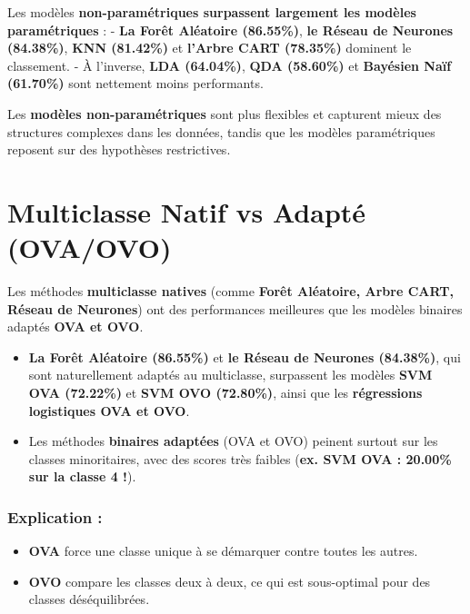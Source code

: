 \documentclass[
]{article}
\providecommand{\tightlist}{%
  \setlength{\itemsep}{0pt}\setlength{\parskip}{0pt}}\usepackage{longtable,booktabs,array}
\begin{document}
Les modèles \textbf{non-paramétriques surpassent largement les modèles
paramétriques} : - \textbf{La Forêt Aléatoire (86.55\%)}, \textbf{le
Réseau de Neurones (84.38\%)}, \textbf{KNN (81.42\%)} et \textbf{l'Arbre
CART (78.35\%)} dominent le classement. - À l'inverse, \textbf{LDA
(64.04\%)}, \textbf{QDA (58.60\%)} et \textbf{Bayésien Naïf (61.70\%)}
sont nettement moins performants.

Les \textbf{modèles non-paramétriques} sont plus flexibles et capturent
mieux des structures complexes dans les données, tandis que les modèles
paramétriques reposent sur des hypothèses restrictives.

\section{Multiclasse Natif vs Adapté
(OVA/OVO)}\label{multiclasse-natif-vs-adaptuxe9-ovaovo}

Les méthodes \textbf{multiclasse natives} (comme \textbf{Forêt
Aléatoire, Arbre CART, Réseau de Neurones}) ont des performances
meilleures que les modèles binaires adaptés \textbf{OVA et OVO}.

\begin{itemize}
\tightlist
\item
  \textbf{La Forêt Aléatoire (86.55\%)} et \textbf{le Réseau de Neurones
  (84.38\%)}, qui sont naturellement adaptés au multiclasse, surpassent
  les modèles \textbf{SVM OVA (72.22\%)} et \textbf{SVM OVO (72.80\%)},
  ainsi que les \textbf{régressions logistiques OVA et OVO}.
\item
  Les méthodes \textbf{binaires adaptées} (OVA et OVO) peinent surtout
  sur les classes minoritaires, avec des scores très faibles
  (\textbf{ex. SVM OVA : 20.00\% sur la classe 4 !}).
\end{itemize}

\subsubsection{Explication :}\label{explication}

\begin{itemize}
\tightlist
\item
  \textbf{OVA} force une classe unique à se démarquer contre toutes les
  autres.
\item
  \textbf{OVO} compare les classes deux à deux, ce qui est sous-optimal
  pour des classes déséquilibrées.
\end{itemize}
\end{document}
